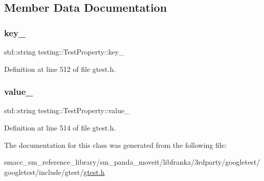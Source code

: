 \subsection{Member Data Documentation}
\mbox{\label{classtesting_1_1TestProperty_a948544067d61e790bd37e234186fa708}} 
\subsubsection{\texorpdfstring{key\+\_\+}{key\_}}
{\footnotesize\ttfamily std\+::string testing\+::\+Test\+Property\+::key\+\_\+\hspace{0.3cm}{\ttfamily [private]}}



Definition at line 512 of file gtest.\+h.

\mbox{\label{classtesting_1_1TestProperty_a204e3793205a1e61412fc34be1913c01}} 
\subsubsection{\texorpdfstring{value\+\_\+}{value\_}}
{\footnotesize\ttfamily std\+::string testing\+::\+Test\+Property\+::value\+\_\+\hspace{0.3cm}{\ttfamily [private]}}



Definition at line 514 of file gtest.\+h.



The documentation for this class was generated from the following file\+:\begin{DoxyCompactItemize}
\item 
smacc\+\_\+sm\+\_\+reference\+\_\+library/sm\+\_\+panda\+\_\+moveit/libfranka/3rdparty/googletest/googletest/include/gtest/\hyperlink{gtest_8h}{gtest.\+h}\end{DoxyCompactItemize}
